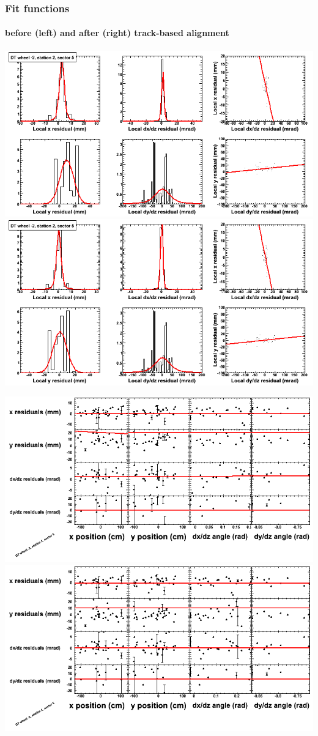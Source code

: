 \documentclass[compress]{beamer}
\begin{document}
\begin{frame}
\frametitle{Fit functions}
\framesubtitle{before (left) and after (right) track-based alignment}
\includegraphics[width=0.5\linewidth]{fitfunctions_re01/MBwhAst2sec05_bellcurves.png} \includegraphics[width=0.5\linewidth]{fitfunctions_re05/MBwhAst2sec05_bellcurves.png}

\includegraphics[width=0.5\linewidth]{fitfunctions_re01/MBwhAst2sec05_polynomials.png} \includegraphics[width=0.5\linewidth]{fitfunctions_re05/MBwhAst2sec05_polynomials.png}
\end{frame}
\end{document}
